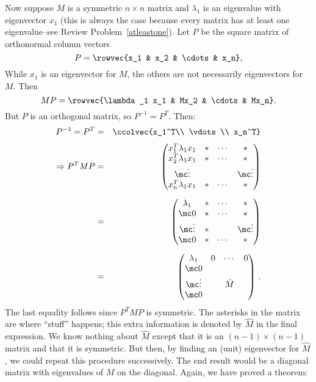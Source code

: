 Now suppose $M$ is a symmetric $n\times n$ matrix and $\lambda_1$ is an eigenvalue with eigenvector $x_1$ (this is always the case because every matrix has at least one eigenvalue--see Review Problem~\ref{atleastone}).  
Let $P$ be the square matrix of orthonormal column vectors 
\[
P=\rowvec{x_1 & x_2 & \cdots & x_n},
\]
While $x_1$ is an eigenvector for $M$, the others are not necessarily eigenvectors for $M$.  
Then
\[
MP=\rowvec{\lambda_1 x_1 & Mx_2 & \cdots & Mx_n}.
\]
But $P$ is an orthogonal matrix, so $P^{-1}=P^T$.  Then:
\begin{eqnarray*}
P^{-1}=P^T &=& \ccolvec{x_1^T\\ \vdots \\ x_n^T} \\[1mm]
\Rightarrow P^TMP &=& \begin{pmatrix}
  x_1^T\lambda_1x_1  & * & \cdots & *\\
  x_2^T\lambda_1x_1  & * & \cdots & *\\
  \mc\vdots             &   & & \mc\vdots\\
   x_n^T\lambda_1x_1 & * & \cdots & *\\
  \end{pmatrix}\\[2mm]
&=& \begin{pmatrix}
  \lambda_1  & * & \cdots & *\\
  \mc 0  & * & \cdots & *\\
 \mc \vdots             & *  & & \mc\vdots\\
  \mc 0 & * & \cdots & *\\
  \end{pmatrix}\\[2mm]
&=& \begin{pmatrix}
  \lambda_1  & 0 & \cdots & 0\\
  \mc 0          & & & \\
  \mc\vdots     & & \hat{M} & \\
  \mc0          & & & \\
  \end{pmatrix}\, .\\
\end{eqnarray*}
The last equality follows since $P^TMP$ is symmetric.  The asterisks in the matrix are where ``stuff'' happens; this extra information is denoted by $\hat{M}$ in the final expression.  We know nothing about $\hat{M}$ except that it is an $(n-1)\times (n-1)$ matrix and that it is symmetric.  But then, by finding an (unit) eigenvector for $\hat{M}$, we could repeat this procedure successively.  The end result would be a diagonal matrix with eigenvalues of $M$ on the diagonal. Again, we have proved a theorem: %


